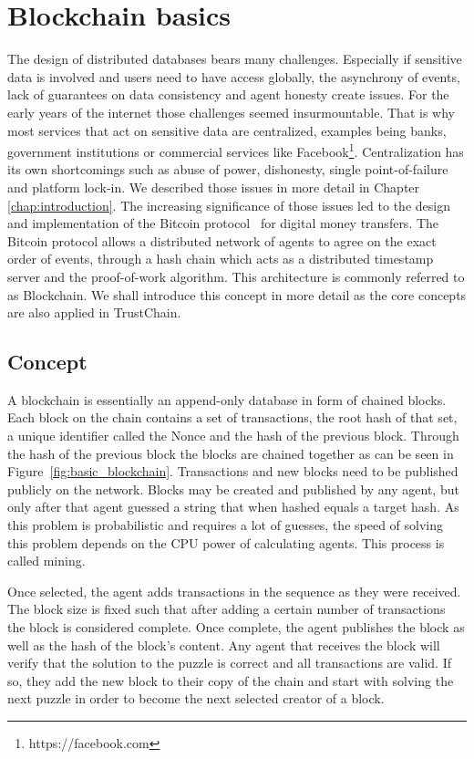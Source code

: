 \section{Blockchain basics}
The design of distributed databases bears many challenges. Especially if sensitive data is involved
and users need to have access globally, the asynchrony of events, lack of guarantees on data 
consistency and agent honesty create issues. For the early years of the internet those challenges seemed
insurmountable. That is why most services that act on sensitive data are centralized, examples being 
banks, government institutions or commercial services like Facebook\footnote{https://facebook.com}.
Centralization has its own shortcomings such as abuse of power, dishonesty, single point-of-failure
and platform lock-in. We described those issues in more detail in Chapter \ref{chap:introduction}.
The increasing significance of those issues led to the design and implementation of the Bitcoin 
protocol~\cite{nakamoto2008bitcoin} for digital money transfers. The Bitcoin protocol allows a distributed network of agents 
to agree on the exact order of events, through a hash chain which acts as a distributed timestamp 
server and the proof-of-work algorithm. This architecture is commonly referred to as Blockchain. We
shall introduce this concept in more detail as the core concepts are also applied in TrustChain.

\subsection{Concept}
A blockchain is essentially an append-only database in form of chained blocks. Each block on the 
chain contains a set of transactions, the root hash of that set, a unique identifier called the 
Nonce and the hash of the previous block. Through the hash of the previous block the blocks are 
chained together as can be seen in Figure~\ref{fig:basic_blockchain}. Transactions and new blocks need to be published publicly on 
the network. Blocks may be created and published by any agent, but only after that agent guessed 
a string that when hashed equals a target hash. As this problem is probabilistic and requires a lot
of guesses, the speed of solving this problem depends on the CPU power of calculating agents. This 
process is called mining.

Once selected, the agent adds transactions in the sequence as they 
were received. The block size is fixed such that after adding a certain number of 
transactions the block is considered complete. Once complete, the agent publishes the
block as well as the hash of the block's content. Any agent that receives the block will verify that
the solution to the puzzle is correct and all transactions are valid. If so, they add the new block
to their copy of the chain and start with solving the next puzzle in order to become the next selected
creator of a block.

